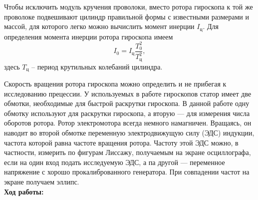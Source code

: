 \documentclass[a4paper,12pt]{article} %
\begin{document}
Чтобы исключить модуль кручения проволоки, вместо ротора гироскопа к той же проволоке подвешивают цилиндр правильной формы с известными размерами и массой, для которого легко можно вычислить момент инерции $I_\text{ц}$. Для определения момента инерции ротора гироскопа имеем
\begin{equation}
I_0 = I_\text{ц}\frac{T_0^2}{T_{\text{ц}}^2},
\end{equation}
здесь $T_\text{ц}$ -- период крутильных колебаний цилиндра.

Скорость вращения ротора гироскопа можно определить и не прибегая к исследованию прецессии. У используемых в работе гироскопов статор имеет две обмотки, необходимые для быстрой раскрутки гироскопа. В данной работе одну обмотку используют для раскрутки гироскопа, а вторую — для измерения числа оборотов ротора. Ротор электромотора всегда немного намагничен. Вращаясь, он наводит во второй обмотке переменную электродвижущую силу (ЭДС) индукции, частота которой равна частоте вращения ротора. Частоту этой ЭДС можно, в частности, измерить по фигурам Лиссажу, получаемым на экране осциллографа, если на один вход подать исследуемую ЭДС, а па другой — переменное напряжение с хорошо прокалиброванного генератора. При совпадении частот на экране получаем эллипс.\\
\textbf{Ход работы:} 
\end{document}
